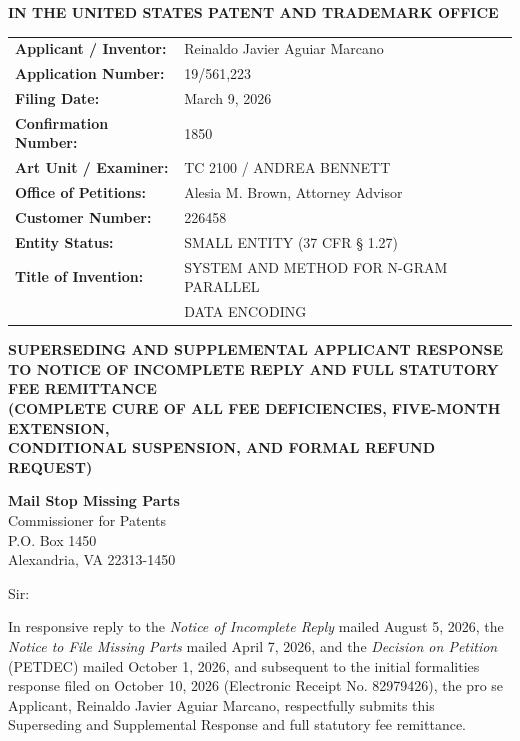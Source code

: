 \documentclass[11pt,letterpaper]{article}
\begin{document}
\thispagestyle{empty}

\begin{center}
    \textbf{\large IN THE UNITED STATES PATENT AND TRADEMARK OFFICE}
\end{center}

\vspace{0.3cm}
\noindent\begin{tabular}{p{2.3in}p{4.0in}}
\textbf{Applicant / Inventor:} & Reinaldo Javier Aguiar Marcano \\
\textbf{Application Number:} & 19/561,223 \\
\textbf{Filing Date:} & March 9, 2026 \\
\textbf{Confirmation Number:} & 1850 \\
\textbf{Art Unit / Examiner:} & TC 2100 / ANDREA BENNETT \\
\textbf{Office of Petitions:} & Alesia M. Brown, Attorney Advisor \\
\textbf{Customer Number:} & 226458 \\
\textbf{Entity Status:} & SMALL ENTITY (37 CFR \S{} 1.27) \\
\textbf{Title of Invention:} & SYSTEM AND METHOD FOR N-GRAM PARALLEL \\
& DATA ENCODING \\
\end{tabular}

\vspace{0.4cm}
\begin{center}
    \textbf{\large SUPERSEDING AND SUPPLEMENTAL APPLICANT RESPONSE \\
    TO NOTICE OF INCOMPLETE REPLY AND FULL STATUTORY FEE REMITTANCE} \\
    \textbf{\normalsize (COMPLETE CURE OF ALL FEE DEFICIENCIES, FIVE-MONTH EXTENSION, \\
    CONDITIONAL SUSPENSION, AND FORMAL REFUND REQUEST)}
\end{center}

\noindent\textbf{Mail Stop Missing Parts} \\
Commissioner for Patents \\
P.O. Box 1450 \\
Alexandria, VA 22313-1450

\vspace{0.2cm}
Sir:

In responsive reply to the \textit{Notice of Incomplete Reply} mailed August 5, 2026, the \textit{Notice to File Missing Parts} mailed April 7, 2026, and the \textit{Decision on Petition} (PETDEC) mailed October 1, 2026, and subsequent to the initial formalities response filed on October 10, 2026 (Electronic Receipt No. 82979426), the pro se Applicant, Reinaldo Javier Aguiar Marcano, respectfully submits this Superseding and Supplemental Response and full statutory fee remittance.
\end{document}
